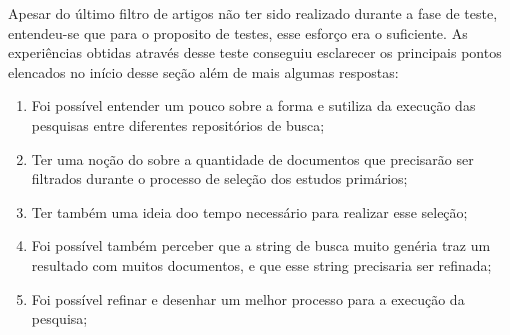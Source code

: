 Apesar do último filtro de artigos não ter sido realizado durante a fase de teste, entendeu-se que para o proposito de testes, esse esforço era o suficiente. As experiências obtidas através desse teste conseguiu esclarecer os principais pontos elencados no início desse seção além de mais algumas respostas:

 \begin{enumerate}
     \item Foi possível entender um pouco sobre a forma e sutiliza da execução das pesquisas entre diferentes repositórios de busca;
     \item Ter uma noção do sobre a quantidade de documentos que precisarão ser filtrados durante o processo de seleção dos estudos primários;
     \item Ter também uma ideia doo tempo necessário para realizar esse seleção;
     \item Foi possível também perceber que a string de busca muito genéria traz um resultado com muitos documentos, e que esse string precisaria ser refinada;
     \item Foi possível refinar e desenhar um melhor processo para a execução da pesquisa;
 \end{enumerate}